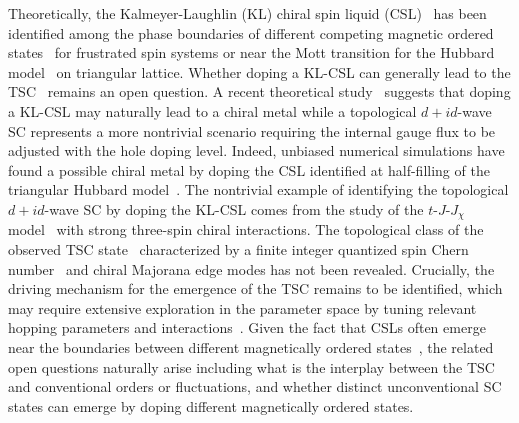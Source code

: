 \documentclass[aps,prx,reprint,superscriptaddress,showpacs]{revtex4-2}
\begin{document}
Theoretically, the Kalmeyer-Laughlin (KL) chiral spin liquid (CSL)~\cite{kalmeyer1987equivalence,wen1989chiral} has been identified among the phase boundaries of different competing magnetic ordered states~\cite{bauer2014,he2014,gong2014,gong2017global,wietek2017chiral} for frustrated spin systems or near the Mott transition for the Hubbard model~\cite{szasz2020chiral,chen2021quantum} on triangular lattice. Whether doping a KL-CSL can generally lead to the TSC~\cite{kalmeyer1987equivalence,wen1989chiral,laughlin1988,lee1989,jiang2017holon,jiang2020topological,zhu2022doped,song2021doping}
remains an open question. A recent theoretical study~\cite{song2021doping} suggests that doping a KL-CSL may naturally lead to a chiral metal while a topological $d+id$-wave SC represents a more nontrivial scenario requiring the internal gauge flux to be adjusted with the hole doping level.
Indeed, unbiased numerical simulations have found a possible chiral metal by doping the CSL identified at half-filling of the triangular Hubbard model~\cite{szasz2020chiral, zhu2022doped}.
The  nontrivial  example of identifying the topological $d+id$-wave SC by doping the KL-CSL comes from  the study of the  $t$-$J$-$J_{\chi}$ model~\cite{jiang2020topological} with strong three-spin chiral interactions.  The  topological class of the observed TSC state~\cite{jiang2020topological}  characterized by a finite  integer quantized spin Chern number~\cite{read2000paired, senthil1999spin} and chiral Majorana edge modes has not been revealed. Crucially, the driving mechanism  for the emergence of the TSC  remains to be identified, which may require extensive exploration in the parameter space by tuning relevant hopping parameters and interactions~\cite{gong2017global,wietek2017chiral,jiang2020topological}. Given the fact that CSLs often emerge near the boundaries between different magnetically ordered states~\cite{gong2017global,wietek2017chiral}, the related open questions  naturally arise including what is the interplay between the TSC and conventional orders or fluctuations, and whether distinct unconventional SC states can emerge  by doping  different magnetically ordered states.   
\end{document}
